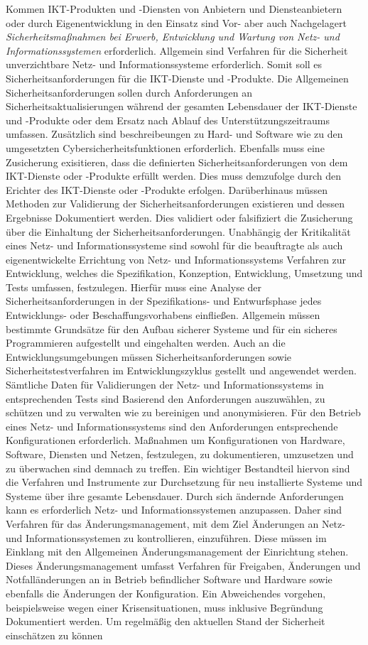 \documentclass[11pt,a4paper,hidelinks]{article}   %
\begin{document}
            Kommen IKT-Produkten und -Diensten von Anbietern und Diensteanbietern oder durch Eigenentwicklung in den Einsatz sind Vor- aber auch Nachgelagert \emph{Sicherheitsmaßnahmen bei Erwerb, Entwicklung und Wartung von Netz- und Informationssystemen} erforderlich. Allgemein sind Verfahren für die Sicherheit unverzichtbare Netz- und Informationssysteme erforderlich. Somit soll es Sicherheitsanforderungen für die IKT-Dienste und -Produkte. Die Allgemeinen Sicherheitsanforderungen sollen durch Anforderungen an Sicherheitsaktualisierungen während der gesamten Lebensdauer der IKT-Dienste und -Produkte oder dem Ersatz nach Ablauf des Unterstützungszeitraums umfassen. Zusätzlich sind beschreibeungen zu Hard- und Software wie zu den umgesetzten Cybersicherheitsfunktionen erforderlich. Ebenfalls muss eine Zusicherung exisitieren, dass die definierten Sicherheitsanforderungen von dem IKT-Dienste oder -Produkte erfüllt werden. Dies muss demzufolge durch den Erichter des IKT-Dienste oder -Produkte erfolgen. Darüberhinaus müssen Methoden zur Validierung der Sicherheitsanforderungen existieren und dessen Ergebnisse Dokumentiert werden. Dies validiert oder falsifiziert die Zusicherung über die Einhaltung der Sicherheitsanforderungen. Unabhängig der Kritikalität eines Netz- und Informationssysteme sind sowohl für die beauftragte als auch eigenentwickelte Errichtung von Netz- und Informationssystems Verfahren zur Entwicklung, welches die Spezifikation, Konzeption, Entwicklung, Umsetzung und Tests umfassen, festzulegen. Hierfür muss eine Analyse der Sicherheitsanforderungen in der Spezifikations- und Entwurfsphase jedes Entwicklungs- oder Beschaffungsvorhabens einfließen. Allgemein müssen bestimmte Grundsätze für den Aufbau sicherer Systeme und für ein sicheres Programmieren aufgestellt und eingehalten werden. Auch an die Entwicklungsumgebungen müssen Sicherheitsanforderungen sowie Sicherheitstestverfahren im Entwicklungszyklus gestellt und angewendet werden. Sämtliche Daten für Validierungen der Netz- und Informationssystems in entsprechenden Tests sind Basierend den Anforderungen auszuwählen, zu schützen und zu verwalten wie zu bereinigen und anonymisieren. Für den Betrieb eines Netz- und Informationssystems sind den Anforderungen entsprechende Konfigurationen erforderlich. Maßnahmen um Konfigurationen von Hardware, Software, Diensten und Netzen, festzulegen, zu dokumentieren, umzusetzen und zu überwachen sind demnach zu treffen. Ein wichtiger Bestandteil hiervon sind die Verfahren und Instrumente zur Durchsetzung für neu installierte Systeme und Systeme über ihre gesamte Lebensdauer. Durch sich ändernde Anforderungen kann es erforderlich Netz- und Informationssystemen anzupassen. Daher sind Verfahren für das Änderungsmanagement, mit dem Ziel Änderungen an Netz- und Informationssystemen zu kontrollieren, einzuführen. Diese müssen im Einklang mit den Allgemeinen Änderungsmanagement der Einrichtung stehen. Dieses Änderungsmanagement umfasst Verfahren für Freigaben, Änderungen und Notfalländerungen an in Betrieb befindlicher Software und Hardware sowie ebenfalls die Änderungen der Konfiguration. Ein Abweichendes vorgehen, beispielsweise wegen einer Krisensituationen, muss inklusive Begründung Dokumentiert werden. Um regelmäßig den aktuellen Stand der Sicherheit einschätzen zu können 
\end{document}
